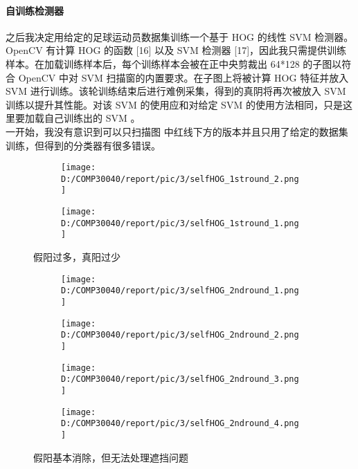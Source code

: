 \documentclass{article}
\begin{document}
\paragraph{自训练检测器}
之后我决定用给定的足球运动员数据集训练一个基于 HOG 的线性 SVM 检测器。 OpenCV 有计算 HOG 的函数 [16] 以及 SVM 检测器 [17]，因此我只需提供训练样本。在加载训练样本后，每个训练样本会被在正中央剪裁出 64*128 的子图以符合 OpenCV 中对 SVM 扫描窗的内置要求。在子图上将被计算 HOG 特征并放入 SVM 进行训练。该轮训练结束后进行难例采集，得到的真阴将再次被放入 SVM 训练以提升其性能。对该 SVM 的使用应和对给定 SVM 的使用方法相同，只是这里要加载自己训练出的 SVM 。\\
一开始，我没有意识到可以只扫描图 中红线下方的版本并且只用了给定的数据集训练，但得到的分类器有很多错误。
\begin{figure}[h!]
  \begin{subfigure}[b]{\linewidth}
  \centering
    \texttt{[image: D:/COMP30040/report/pic/3/selfHOG\_1stround\_2.png]} 
  \end{subfigure}
  \begin{subfigure}[b]{\linewidth}
  \centering
    \texttt{[image: D:/COMP30040/report/pic/3/selfHOG\_1stround\_1.png]} 
  \end{subfigure}
  \caption{假阳过多，真阳过少}
\end{figure}

\begin{figure}[h!]
  \begin{subfigure}[b]{\linewidth}
  \centering
    \texttt{[image: D:/COMP30040/report/pic/3/selfHOG\_2ndround\_1.png]} 
  \end{subfigure}
  \begin{subfigure}[b]{\linewidth}
  \centering
    \texttt{[image: D:/COMP30040/report/pic/3/selfHOG\_2ndround\_2.png]} 
  \end{subfigure}
  \begin{subfigure}[b]{\linewidth}
  \centering
    \texttt{[image: D:/COMP30040/report/pic/3/selfHOG\_2ndround\_3.png]} 
  \end{subfigure}
  \begin{subfigure}[b]{\linewidth}
  \centering
    \texttt{[image: D:/COMP30040/report/pic/3/selfHOG\_2ndround\_4.png]} 
  \end{subfigure}
  \caption{假阳基本消除，但无法处理遮挡问题}
\end{figure}
\end{document}
